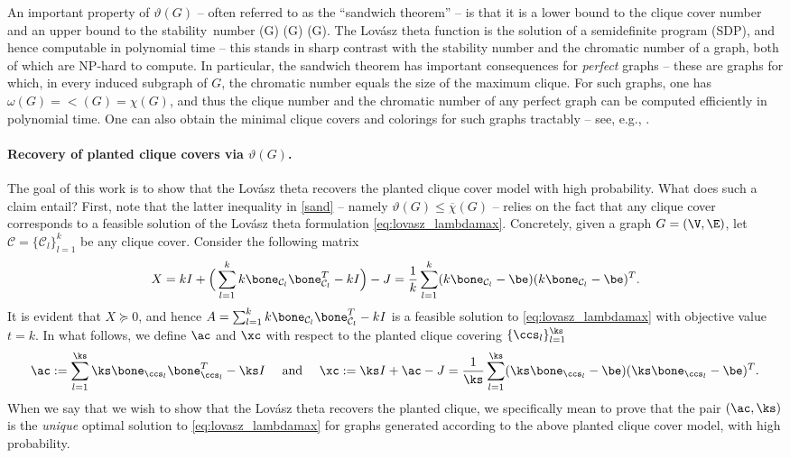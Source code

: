  An important property of $\vartheta(G)$ -- often referred to as the ``sandwich theorem'' -- is that it is a lower bound to the clique cover number and an upper bound to the stability~{number \cite{theta}}
\beq \label{sand}
\alpha(G) \leq \lt (G) \leq \overline{\chi}(G).
\eeq
The Lov\'asz theta function is the solution of a semidefinite program (SDP), and hence computable in polynomial time \cite{NesNem:94,Ren:01} -- this stands in sharp contrast with the stability number and the chromatic number of a graph, both of which are NP-hard to compute.  In particular, the sandwich theorem has important consequences for {\em perfect} graphs -- these are graphs for which, in every induced subgraph of $G$, the chromatic number equals the size of the maximum clique.  For such graphs, one has $\omega(G) = \lt(G) = \chi(G)$, and thus the clique number and the chromatic number of any perfect graph can be computed efficiently in polynomial time.  One can also obtain the minimal clique covers and colorings for such graphs tractably -- see, e.g., \cite[Section 6.3.2]{monique}. 


\paragraph{Recovery of planted clique covers via $\vartheta(G)$.} The goal of this work is to show that the Lov\'asz theta recovers the planted clique cover model with high probability.  What does such a claim entail?  First, note that the latter inequality in \eqref{sand} -- namely $ \vartheta (G) \leq \overline{\chi}(G)$ -- relies on the fact that any clique cover corresponds to a feasible solution of the Lov\'asz theta formulation \eqref{eq:lovasz_lambdamax}.  
Concretely, given a graph $G=(\V,\E)$, let $\mathcal{C}=\{\mathcal{C}_l\}_{l=1}^{k}$ be any clique cover.  Consider the following matrix
\begin{equation} \label{eq:feasiblesolution}
X = kI + \Big(\sum_{l=1}^kk\bone_{\mathcal{C}_l}\bone_{\mathcal{C}_l}^T-kI \Big) - J = {1\over k}\sum_{l=1}^{k} (k\bone_{\mathcal{C}_l}-\be) (k\bone_{\mathcal{C}_l}-\be)^T.
\end{equation}
It is evident that $X \succeq 0$, and hence $A=\sum_{l=1}^kk\bone_{\mathcal{C}_l}\bone_{\mathcal{C}_l}^T-kI$ is a feasible solution to \eqref{eq:lovasz_lambdamax} with objective value $t=k$.  In what follows, we define $\ac$ and $\xc$ with respect to the planted clique covering $\{\ccs_l\}_{l=1}^{\ks}$
\begin{equation} \label{eq:feasiblesolution}
\ac := \sum_{l=1}^{\ks} \ks \bone_{\ccs_l}\bone_{\ccs_l}^T-\ks I \quad \text{ and } \quad  \xc  := \ks I + \ac - J = {1\over \ks}\sum_{l=1}^{\ks} (\ks\bone_{\ccs_l}-\be) (\ks\bone_{\ccs_l}-\be)^T.
\end{equation}
When we say that we wish to show that the Lov\'asz theta recovers the planted clique, we specifically mean to prove that the pair $(\ac,\ks)$ is the {\em unique} optimal solution to \eqref{eq:lovasz_lambdamax} for graphs generated according to the above planted clique cover model, with high probability.     

